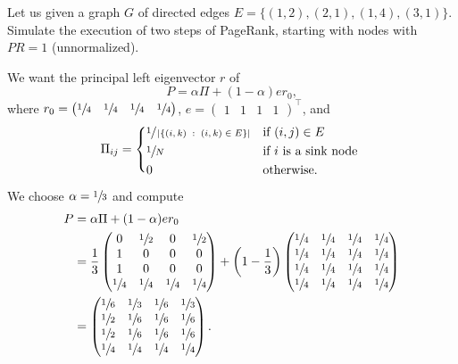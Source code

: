 \exercise

Let us given a graph $G$ of directed edges $E=\{(1,2), (2,1), (1,4), (3,1)\}$.
Simulate the execution of two steps of PageRank, starting with nodes with $PR=1$
(unnormalized).%

\solution

We want the principal left eigenvector $r$ of
%
$$P = \alpha\Pi + (1-\alpha) er_0,$$
%
where $r_0 = \begin{pmatrix}\sfrac{1}{4}&\sfrac{1}{4}&\sfrac{1}{4}&\sfrac{1}{4}
\end{pmatrix}$, $e=\begin{pmatrix}1&1&1&1\end{pmatrix}^\top$, and
%
\begin{equation*}
  \Pi_{ij} =
  \begin{cases*}
    \sfrac{1}{\left|\left\{(i,k)\;:\;(i,k)\in E\right\}\right|}
      & if $(i,j) \in E$ \\
    \sfrac{1}{N} & if $i$ is a sink node \\
    0 & otherwise.
  \end{cases*}
\end{equation*}

We choose $\alpha=\sfrac{1}{3}$ and compute
%
\begin{align*}
  P &=  \alpha\Pi + (1-\alpha) er_0 \\
    &=
        \frac{1}{3}
        \begin{pmatrix}
          0&\sfrac{1}{2}&0&\sfrac{1}{2} \\
          1&0&0&0 \\
          1&0&0&0 \\
          \sfrac{1}{4}&\sfrac{1}{4}&\sfrac{1}{4}&\sfrac{1}{4}
        \end{pmatrix}
        +
        \left(1-\frac{1}{3}\right)
        \begin{pmatrix}
          \sfrac{1}{4}&\sfrac{1}{4}&\sfrac{1}{4}&\sfrac{1}{4} \\
          \sfrac{1}{4}&\sfrac{1}{4}&\sfrac{1}{4}&\sfrac{1}{4} \\
          \sfrac{1}{4}&\sfrac{1}{4}&\sfrac{1}{4}&\sfrac{1}{4} \\
          \sfrac{1}{4}&\sfrac{1}{4}&\sfrac{1}{4}&\sfrac{1}{4}
        \end{pmatrix} \\
    &=
        \begin{pmatrix}
          \sfrac{1}{6}&\sfrac{1}{3}&\sfrac{1}{6}&\sfrac{1}{3} \\
          \sfrac{1}{2}&\sfrac{1}{6}&\sfrac{1}{6}&\sfrac{1}{6} \\
          \sfrac{1}{2}&\sfrac{1}{6}&\sfrac{1}{6}&\sfrac{1}{6} \\
          \sfrac{1}{4}&\sfrac{1}{4}&\sfrac{1}{4}&\sfrac{1}{4}
        \end{pmatrix}.
\end{align*}

